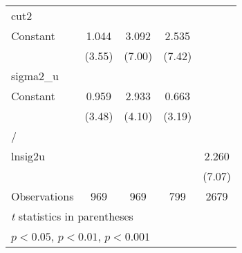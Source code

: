 {\begin{tabular}{l*{4}{c}}
\hline
cut2            &                  &                  &                  &                  \\
Constant        &    1.044\sym{***}&    3.092\sym{***}&    2.535\sym{***}&                  \\
                &   (3.55)         &   (7.00)         &   (7.42)         &                  \\
\hline
sigma2\_u        &                  &                  &                  &                  \\
Constant        &    0.959\sym{***}&    2.933\sym{***}&    0.663\sym{**} &                  \\
                &   (3.48)         &   (4.10)         &   (3.19)         &                  \\
\hline
/               &                  &                  &                  &                  \\
lnsig2u         &                  &                  &                  &    2.260\sym{***}\\
                &                  &                  &                  &   (7.07)         \\
\hline
Observations    &      969         &      969         &      799         &     2679         \\
\hline\hline
\multicolumn{5}{l}{\footnotesize \textit{t} statistics in parentheses}\\
\multicolumn{5}{l}{\footnotesize \sym{*} \(p<0.05\), \sym{**} \(p<0.01\), \sym{***} \(p<0.001\)}\\
\end{tabular}
}
